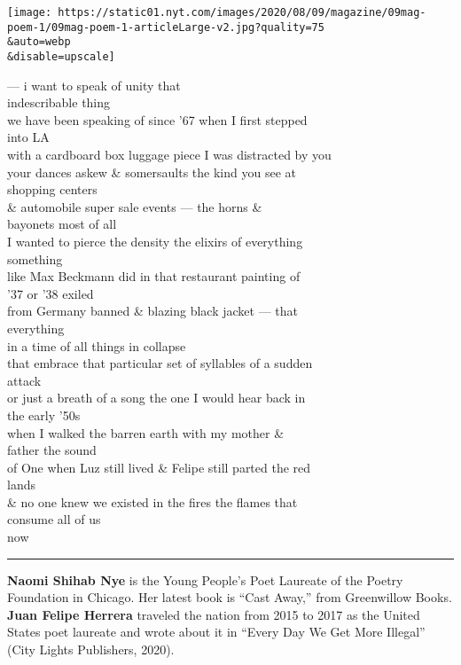 \texttt{[image: https://static01.nyt.com/images/2020/08/09/magazine/09mag-poem-1/09mag-poem-1-articleLarge-v2.jpg?quality=75\\\&auto=webp\\\&disable=upscale]}

--- i want to speak of unity that\\
indescribable thing\\
we have been speaking of since '67 when I first stepped\\
into LA\\
with a cardboard box luggage piece I was distracted by you\\
your dances askew \& somersaults the kind you see at\\
shopping centers\\
\& automobile super sale events --- the horns \&\\
bayonets most of all\\
I wanted to pierce the density the elixirs of everything\\
something\\
like Max Beckmann did in that restaurant painting of\\
'37 or '38 exiled\\
from Germany banned \& blazing black jacket --- that\\
everything\\
in a time of all things in collapse\\
that embrace that particular set of syllables of a sudden\\
attack\\
or just a breath of a song the one I would hear back in\\
the early '50s\\
when I walked the barren earth with my mother \&\\
father the sound\\
of One when Luz still lived \& Felipe still parted the red\\
lands\\
\& no one knew we existed in the fires the flames that\\
consume all of us\\
now

\begin{center}\rule{0.5\linewidth}{\linethickness}\end{center}

\textbf{Naomi Shihab Nye} is the Young People's Poet Laureate of the
Poetry Foundation in Chicago. Her latest book is ``Cast Away,'' from
Greenwillow Books. \textbf{Juan Felipe Herrera} traveled the nation from
2015 to 2017 as the United States poet laureate and wrote about it in
``Every Day We Get More Illegal'' (City Lights Publishers, 2020).

